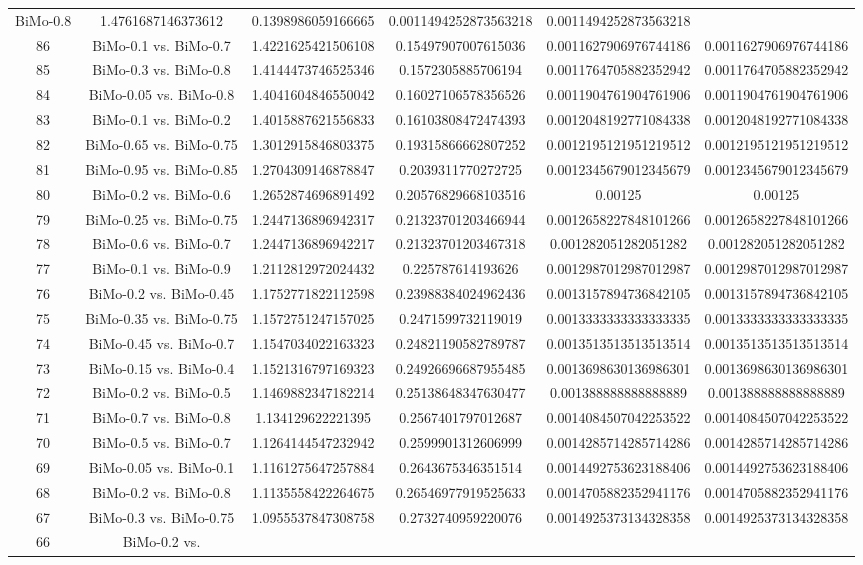 \documentclass[a4paper,10pt]{article}
\begin{document}
\begin{landscape}
\begin{table}[!htp]
\begin{tabular}{cccccc}
BiMo-0.8&1.4761687146373612&0.1398986059166665&0.0011494252873563218&0.0011494252873563218\\86&BiMo-0.1 vs. BiMo-0.7&1.4221625421506108&0.15497907007615036&0.0011627906976744186&0.0011627906976744186\\85&BiMo-0.3 vs. BiMo-0.8&1.4144473746525346&0.1572305885706194&0.0011764705882352942&0.0011764705882352942\\84&BiMo-0.05 vs. BiMo-0.8&1.4041604846550042&0.16027106578356526&0.0011904761904761906&0.0011904761904761906\\83&BiMo-0.1 vs. BiMo-0.2&1.4015887621556833&0.16103808472474393&0.0012048192771084338&0.0012048192771084338\\82&BiMo-0.65 vs. BiMo-0.75&1.3012915846803375&0.19315866662807252&0.0012195121951219512&0.0012195121951219512\\81&BiMo-0.95 vs. BiMo-0.85&1.2704309146878847&0.2039311770272725&0.0012345679012345679&0.0012345679012345679\\80&BiMo-0.2 vs. BiMo-0.6&1.2652874696891492&0.20576829668103516&0.00125&0.00125\\79&BiMo-0.25 vs. BiMo-0.75&1.2447136896942317&0.21323701203466944&0.0012658227848101266&0.0012658227848101266\\78&BiMo-0.6 vs. BiMo-0.7&1.2447136896942217&0.21323701203467318&0.001282051282051282&0.001282051282051282\\77&BiMo-0.1 vs. BiMo-0.9&1.2112812972024432&0.225787614193626&0.0012987012987012987&0.0012987012987012987\\76&BiMo-0.2 vs. BiMo-0.45&1.1752771822112598&0.23988384024962436&0.0013157894736842105&0.0013157894736842105\\75&BiMo-0.35 vs. BiMo-0.75&1.1572751247157025&0.2471599732119019&0.0013333333333333335&0.0013333333333333335\\74&BiMo-0.45 vs. BiMo-0.7&1.1547034022163323&0.24821190582789787&0.0013513513513513514&0.0013513513513513514\\73&BiMo-0.15 vs. BiMo-0.4&1.1521316797169323&0.24926696687955485&0.0013698630136986301&0.0013698630136986301\\72&BiMo-0.2 vs. BiMo-0.5&1.1469882347182214&0.25138648347630477&0.001388888888888889&0.001388888888888889\\71&BiMo-0.7 vs. BiMo-0.8&1.134129622221395&0.2567401797012687&0.0014084507042253522&0.0014084507042253522\\70&BiMo-0.5 vs. BiMo-0.7&1.1264144547232942&0.2599901312606999&0.0014285714285714286&0.0014285714285714286\\69&BiMo-0.05 vs. BiMo-0.1&1.1161275647257884&0.2643675346351514&0.0014492753623188406&0.0014492753623188406\\68&BiMo-0.2 vs. BiMo-0.8&1.1135558422264675&0.26546977919525633&0.0014705882352941176&0.0014705882352941176\\67&BiMo-0.3 vs. BiMo-0.75&1.0955537847308758&0.2732740959220076&0.0014925373134328358&0.0014925373134328358\\66&BiMo-0.2 vs. 
\end{tabular}
\end{table}
\end{landscape}
\end{document}
